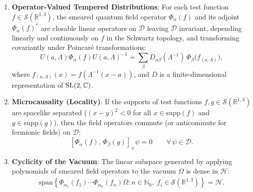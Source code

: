 \begin{enumerate}
    \item[$\mathbf{W3}$] \textbf{Operator-Valued Tempered Distributions}: For each test function $f \in \mathcal{S}(\mathbb{R}^{1,3})$, the smeared quantum field operator $\Phi_\alpha(f)$ and its adjoint $\Phi_\alpha(f)^*$ are closable linear operators on $\mathcal{D}$ leaving $\mathcal{D}$ invariant, depending linearly and continuously on $f$ in the Schwartz topology, and transforming covariantly under Poincaré transformations:
    \begin{equation}
    U(a, \Lambda) \Phi_\alpha(f) U(a, \Lambda)^{-1} = \sum_\beta D_{\alpha\beta}(\Lambda^{-1}) \, \Phi_\beta\bigl( f_{(a, \Lambda)} \bigr),
    \end{equation}
    where $f_{(a, \Lambda)}(x) = f(\Lambda^{-1}(x - a))$, and $D$ is a finite-dimensional representation of $\mathrm{SL}(2, \mathbb{C})$.
    \item[$\mathbf{W4}$] \textbf{Microcausality (Locality)}: If the supports of test functions $f, g \in \mathcal{S}(\mathbb{R}^{1,3})$ are spacelike separated ($(x - y)^2 < 0$ for all $x \in \mathrm{supp}(f)$ and $y \in \mathrm{supp}(g)$), then the field operators commute (or anticommute for fermionic fields) on $\mathcal{D}$:
    \begin{equation}
    \left[ \Phi_\alpha(f), \, \Phi_\beta(g) \right]_\pm \psi = 0 \qquad \forall \, \psi \in \mathcal{D}.
    \end{equation}
    \item[$\mathbf{W5}$] \textbf{Cyclicity of the Vacuum}: The linear subspace generated by applying polynomials of smeared field operators to the vacuum $\Omega$ is dense in $\mathcal{H}$:
    \begin{equation}
    \overline{\mathrm{span} \left\{ \Phi_{\alpha_1}(f_1) \cdots \Phi_{\alpha_n}(f_n) \Omega : n \in \mathbb{N}_0, \; f_i \in \mathcal{S}(\mathbb{R}^{1,3}) \right\}} = \mathcal{H}.
    \end{equation}
\end{enumerate}

